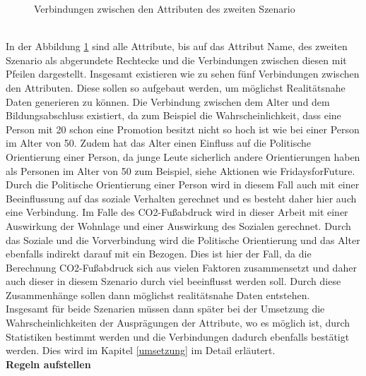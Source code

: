 \begin{onehalfspace}
\begin{figure}[h]
    \caption{Verbindungen zwischen den Attributen des zweiten Szenario}
    \label{fig:VerbindungenS2}
\end{figure}\\
In der Abbildung \ref{fig:VerbindungenS2} sind alle Attribute, bis auf das Attribut Name, des zweiten Szenario als abgerundete Rechtecke und die Verbindungen zwischen diesen mit Pfeilen dargestellt. Insgesamt existieren wie zu sehen fünf Verbindungen zwischen den Attributen. Diese sollen so aufgebaut werden, um möglichst Realitätsnahe Daten generieren zu können. Die Verbindung zwischen dem Alter und dem Bildungsabschluss existiert, da zum Beispiel die Wahrscheinlichkeit, dass eine Person mit 20 schon eine Promotion besitzt nicht so hoch ist wie bei einer Person im Alter von 50. Zudem hat das Alter einen Einfluss auf die Politische Orientierung einer Person, da junge Leute sicherlich andere Orientierungen haben als Personen im Alter von 50 zum Beispiel, siehe Aktionen wie \glqq{}FridaysforFuture\grqq{}. Durch die Politische Orientierung einer Person wird in diesem Fall auch mit einer Beeinflussung auf das soziale Verhalten gerechnet und es besteht daher hier auch eine Verbindung. Im Falle des CO2-Fußabdruck wird in dieser Arbeit mit einer Auswirkung der Wohnlage und einer Auswirkung des Sozialen gerechnet. Durch das Soziale und die Vorverbindung wird die Politische Orientierung und das Alter ebenfalls indirekt darauf mit ein Bezogen. Dies ist hier der Fall, da die Berechnung CO2-Fußabdruck sich aus vielen Faktoren zusammensetzt und daher auch dieser in diesem Szenario durch viel beeinflusst werden soll. Durch diese Zusammenhänge sollen dann möglichst realitätsnahe Daten entstehen.\\
Insgesamt für beide Szenarien müssen dann später bei der Umsetzung die Wahrscheinlichkeiten der Ausprägungen der Attribute, wo es möglich ist, durch Statistiken bestimmt werden und die Verbindungen dadurch ebenfalls bestätigt werden. Dies wird im Kapitel \ref{umsetzung} im Detail erläutert.\\
\textbf{Regeln aufstellen}\\

\end{onehalfspace}

